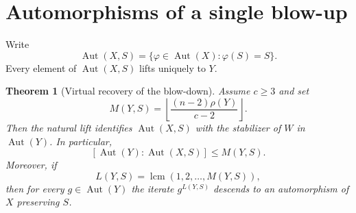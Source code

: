 \documentclass[11pt,reqno]{amsart}
\DeclareMathOperator{\Aut}{Aut}
\DeclareMathOperator{\lcm}{lcm}
\newtheorem{theorem}{Theorem}[section]
\theoremstyle{remark}
\begin{document}
\section{Automorphisms of a single blow-up}

Write
\[
 \Aut(X,S)=\{\varphi\in\Aut(X):\varphi(S)=S\}.
\]
Every element of $\Aut(X,S)$ lifts uniquely to $Y$.

\begin{theorem}[Virtual recovery of the blow-down]\label{thm:single}
Assume $c\ge3$ and set
\[
 M(Y,S)=
 \left\lfloor
 \frac{(n-2)\rho(Y)}{c-2}
 \right\rfloor.
\]
Then the natural lift identifies $\Aut(X,S)$ with the stabilizer of $W$ in $\Aut(Y)$.  In particular,
\begin{equation}\label{eq:index-bound}
 [\Aut(Y):\Aut(X,S)]\le M(Y,S).
\end{equation}
Moreover, if
\[
 L(Y,S)=\lcm(1,2,\ldots,M(Y,S)),
\]
then for every $g\in\Aut(Y)$ the iterate $g^{L(Y,S)}$ descends to an automorphism of $X$ preserving $S$.
\end{theorem}
\end{document}

